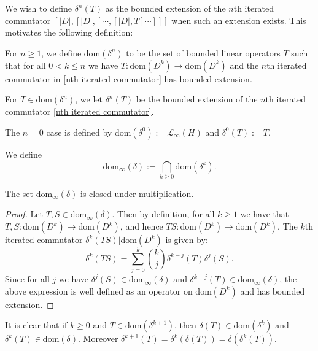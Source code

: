     We wish to define $\delta^n(T)$ as the bounded extension of the $n$th iterated commutator $[|D|,[|D|,[\cdots,[|D|,T]\cdots]]]$
    when such an extension exists. This motivates the following definition:
    \begin{defi}
        For $n\geq 1$, we define $\mathrm{dom}(\delta^n)$ to be the set of bounded linear operators $T$ such that for all $0 < k \leq n$ we
        have $T:\mathrm{dom}(D^k)\to \mathrm{dom}(D^k)$ and the $n$th iterated commutator in \eqref{nth iterated commutator} has bounded extension.
        
        For $T \in \mathrm{dom}(\delta^n)$, we let $\delta^n(T)$ be the bounded extension of the $n$th iterated commutator \eqref{nth iterated commutator}.
        
        The $n=0$ case is defined by $\mathrm{dom}(\delta^0) := \mathcal{L}_\infty(H)$ and $\delta^0(T) := T$.
        
        We define 
        \begin{equation*}
            \mathrm{dom}_\infty(\delta) := \bigcap_{k\geq 0} \mathrm{dom}(\delta^k).
        \end{equation*}
    \end{defi}
    
    \begin{lem}\label{dom delta infty is an algebra}
        The set $\mathrm{dom}_\infty(\delta)$ is closed under multiplication.
    \end{lem}
    \begin{proof}
        Let $T,S \in \mathrm{dom}_\infty(\delta)$. Then by definition, for all $k \geq 1$ we have that $T,S:\mathrm{dom}(D^k)\to \mathrm{dom}(D^k)$,
        and hence $TS:\mathrm{dom}(D^k)\to \mathrm{dom}(D^k)$. The $k$th iterated commutator $\delta^k(TS)|\mathrm{dom}(D^k)$ is given by:
        \begin{equation*}
            \delta^k(TS) = \sum_{j=0}^k \binom{k}{j} \delta^{k-j}(T)\delta^j(S).
        \end{equation*}
        Since for all $j$ we have $\delta^j(S) \in \mathrm{dom}_\infty(\delta)$ and $\delta^{k-j}(T) \in \mathrm{dom}_\infty(\delta)$, the above expression
        is well defined as an operator on $\mathrm{dom}(D^k)$ and has bounded extension.
    \end{proof}
    
    
    It is clear that if $k\geq 0$ and $T \in \mathrm{dom}(\delta^{k+1})$, then $\delta(T) \in \mathrm{dom}(\delta^k)$ and $\delta^k(T) \in \mathrm{dom}(\delta)$. Moreover $\delta^{k+1}(T) = \delta^k(\delta(T)) = \delta(\delta^k(T))$.
    
